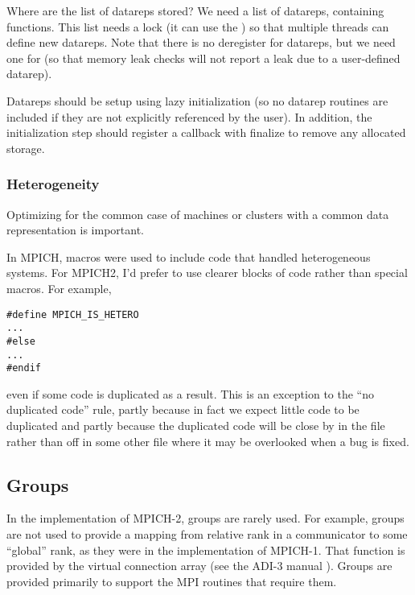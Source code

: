 \documentclass{article}
\begin{document}
Where are the list of datareps stored?  We need a list of datareps,
containing functions.  This list needs a lock (it can use the
) so that multiple threads
can define new datareps.  Note that there is no deregister for
datareps, but we need one for  (so that memory leak
checks will not report a leak due to a user-defined datarep).  

Datareps should be setup using lazy initialization (so no datarep routines are
included if they are not explicitly referenced by the user).  In addition, the
initialization step should register a callback with finalize to remove any
allocated storage.

\subsubsection{Heterogeneity}
\label{sec:hetero}
Optimizing for the common case of machines or clusters with a common
data representation is important.  

In MPICH, macros were used to include code that handled heterogeneous
systems.  For MPICH2, I'd prefer to use clearer blocks of code rather
than special macros.  For example,
\begin{verbatim}
#define MPICH_IS_HETERO
...
#else
...
#endif
\end{verbatim}
even if some code is duplicated as a result.  This is an exception to the ``no
duplicated code'' rule, partly because in fact we expect little code to be
duplicated and partly because the duplicated code will be close by in the
file rather than off in some other file where it may be overlooked when a bug
is fixed.

\subsection{Groups}
\label{sec:groups}



In the implementation of MPICH-2, groups are rarely used.  For
example, groups are not used to provide a mapping from relative rank
in a communicator to some ``global'' rank, as they were in the
implementation of MPICH-1.  That function is provided by the virtual
connection array (see the ADI-3 manual \cite{adi3}).  Groups are
provided primarily to support the MPI 
routines that require them.  
\end{document}
